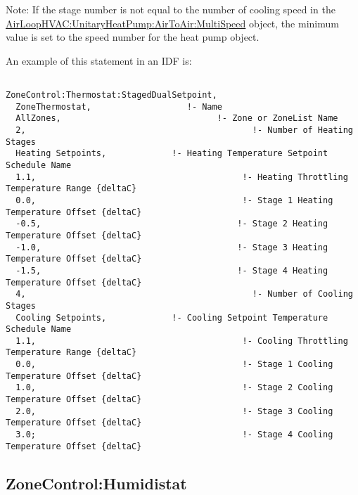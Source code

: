 Note: If the stage number is not equal to the number of cooling speed in the \hyperref[airloophvacunitaryheatpumpairtoairmultispeed]{AirLoopHVAC:UnitaryHeatPump:AirToAir:MultiSpeed} object, the minimum value is set to the speed number for the heat pump object.

An example of this statement in an IDF is:

\begin{lstlisting}

ZoneControl:Thermostat:StagedDualSetpoint,
  ZoneThermostat,                   !- Name
  AllZones,                               !- Zone or ZoneList Name
  2,                                             !- Number of Heating Stages
  Heating Setpoints,             !- Heating Temperature Setpoint Schedule Name
  1.1,                                         !- Heating Throttling Temperature Range {deltaC}
  0.0,                                         !- Stage 1 Heating Temperature Offset {deltaC}
  -0.5,                                       !- Stage 2 Heating Temperature Offset {deltaC}
  -1.0,                                       !- Stage 3 Heating Temperature Offset {deltaC}
  -1.5,                                       !- Stage 4 Heating Temperature Offset {deltaC}
  4,                                             !- Number of Cooling Stages
  Cooling Setpoints,             !- Cooling Setpoint Temperature Schedule Name
  1.1,                                         !- Cooling Throttling Temperature Range {deltaC}
  0.0,                                         !- Stage 1 Cooling Temperature Offset {deltaC}
  1.0,                                         !- Stage 2 Cooling Temperature Offset {deltaC}
  2.0,                                         !- Stage 3 Cooling Temperature Offset {deltaC}
  3.0;                                         !- Stage 4 Cooling Temperature Offset {deltaC}
\end{lstlisting}

\subsection{ZoneControl:Humidistat}\label{zonecontrolhumidistat}

